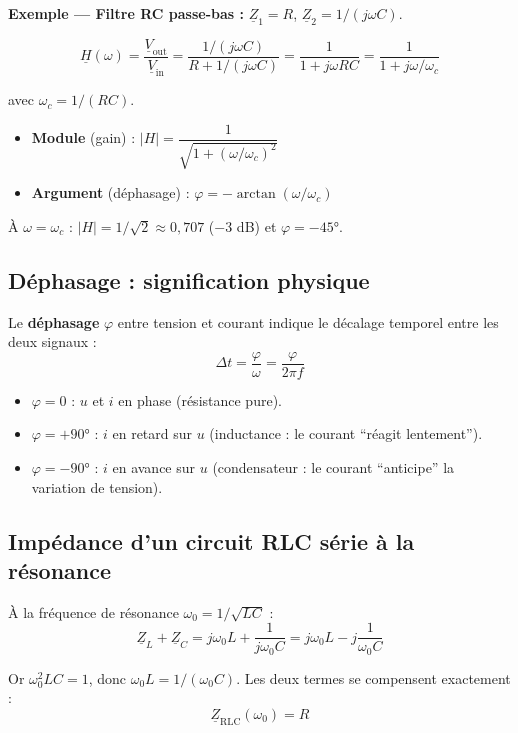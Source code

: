 \documentclass[12pt,a4paper,twoside]{book}
\begin{document}
\textbf{Exemple --- Filtre RC passe-bas :} $\underline{Z}_1 = R$, $\underline{Z}_2 = 1/(j\omega C)$.

\[
\underline{H}(\omega) = \frac{\underline{V}_{\text{out}}}{\underline{V}_{\text{in}}} = \frac{1/(j\omega C)}{R + 1/(j\omega C)} = \frac{1}{1 + j\omega RC} = \frac{1}{1 + j\omega/\omega_c}
\]

avec $\omega_c = 1/(RC)$.

\begin{itemize}[nosep]
\item \textbf{Module} (gain) : $|H| = \dfrac{1}{\sqrt{1 + (\omega/\omega_c)^2}}$
\item \textbf{Argument} (déphasage) : $\varphi = -\arctan(\omega/\omega_c)$
\end{itemize}

À $\omega = \omega_c$ : $|H| = 1/\sqrt{2} \approx 0{,}707$ ($-3$ dB) et $\varphi = -45°$.

\subsection{Déphasage : signification physique}

\begin{intuition}
Le \textbf{déphasage} $\varphi$ entre tension et courant indique le décalage temporel entre les deux signaux :
\[
\Delta t = \frac{\varphi}{\omega} = \frac{\varphi}{2\pi f}
\]
\begin{itemize}[nosep]
\item $\varphi = 0$ : $u$ et $i$ en phase (résistance pure).
\item $\varphi = +90°$ : $i$ en retard sur $u$ (inductance : le courant ``réagit lentement'').
\item $\varphi = -90°$ : $i$ en avance sur $u$ (condensateur : le courant ``anticipe'' la variation de tension).
\end{itemize}
\end{intuition}

\subsection{Impédance d'un circuit RLC série à la résonance}

À la fréquence de résonance $\omega_0 = 1/\sqrt{LC}$ :
\[
\underline{Z}_L + \underline{Z}_C = j\omega_0 L + \frac{1}{j\omega_0 C} = j\omega_0 L - j\frac{1}{\omega_0 C}
\]

Or $\omega_0^2 LC = 1$, donc $\omega_0 L = 1/(\omega_0 C)$. Les deux termes se compensent exactement :
\[
\underline{Z}_{\text{RLC}}(\omega_0) = R
\]
\end{document}
